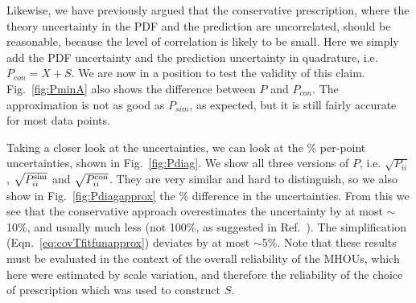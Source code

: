 Likewise, we have previously argued that the conservative prescription, where the theory uncertainty in the PDF and the prediction are uncorrelated, should be reasonable, because the level of correlation is likely to be small. Here we simply add the PDF uncertainty and the prediction uncertainty in quadrature, i.e. $P_{con} = X + S$. We are now in a position to test the validity of this claim. Fig.~\ref{fig:PminA} also shows the difference between $P$ and $P_{con}$. The approximation is not as good as $P_{sim}$, as expected, but it is still fairly accurate for most data points.

Taking a closer look at the uncertainties, we can look at the \% per-point uncertainties, shown in Fig.~\ref{fig:Pdiag}. We show all three versions of $P$, i.e. $\sqrt{P_{ii}}$, $\sqrt{P^{\rm sim}_{ii}}$ and $\sqrt{P^{\rm con}_{ii}}$. They are very similar and hard to distinguish, so we also show in 
Fig.~\ref{fig:Pdiagapprox} the \% difference in the uncertainties. From this we see that the conservative approach overestimates the uncertainty by at most $\sim$10\%, and usually much less (not 100\%, as suggested in Ref.~\cite{Harland-Lang:2018bxd}). The simplification (Eqn.~\ref{eq:covTfitfunapprox}) deviates by at most $\sim$5\%. Note that these results must be evaluated in the context of the overall reliability of the MHOUs, which here were estimated by scale variation, and therefore the reliability of the choice of prescription which was used to construct $S$.

